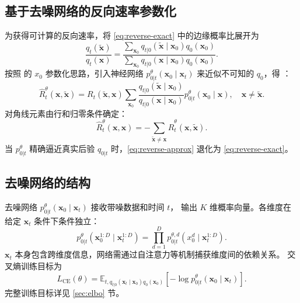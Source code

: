 \documentclass[12pt,a4paper]{ctexbook}
\theoremstyle{definition}
\begin{document}
\subsection{基于去噪网络的反向速率参数化}

为获得可计算的反向速率，将 \eqref{eq:reverse-exact} 中的边缘概率比展开为
\begin{equation}
\frac{q_t(\tilde{\boldsymbol{x}})}{q_t(\boldsymbol{x})} = \frac{\sum_{\boldsymbol{x}_0} q_{t|0}(\tilde{\boldsymbol{x}} \mid \boldsymbol{x}_0) q_0(\boldsymbol{x}_0)}{\sum_{\boldsymbol{x}_0} q_{t|0}(\boldsymbol{x} \mid \boldsymbol{x}_0) q_0(\boldsymbol{x}_0)}. \label{eq:ratio-expand}
\end{equation}
按照 \cite[§2]{austin2021d3pm} 的 $x_0$ 参数化思路，引入神经网络 $p_{0|t}^\theta(\boldsymbol{x}_0 \mid \boldsymbol{x}_t)$
来近似不可知的 $q_0$，得 \cite[§3.1]{campbell2022ctmc}：
\begin{equation}
\hat{R}_t^\theta(\boldsymbol{x}, \tilde{\boldsymbol{x}}) = R_t(\tilde{\boldsymbol{x}}, \boldsymbol{x}) \sum_{\boldsymbol{x}_0} \frac{q_{t|0}(\tilde{\boldsymbol{x}} \mid \boldsymbol{x}_0)}{q_{t|0}(\boldsymbol{x} \mid \boldsymbol{x}_0)} p_{0|t}^\theta(\boldsymbol{x}_0 \mid \boldsymbol{x}), \quad \boldsymbol{x} \neq \tilde{\boldsymbol{x}}. \label{eq:reverse-approx}
\end{equation}
对角线元素由行和归零条件确定：
\begin{equation}
\hat{R}_t^\theta(\boldsymbol{x}, \boldsymbol{x}) = -\sum_{\tilde{\boldsymbol{x}} \neq \boldsymbol{x}} \hat{R}_t^\theta(\boldsymbol{x}, \tilde{\boldsymbol{x}}). \label{eq:reverse-diag}
\end{equation}
当 $p_{0|t}^\theta$ 精确逼近真实后验 $q_{0|t}$ 时，\eqref{eq:reverse-approx} 退化为 \eqref{eq:reverse-exact}。

\subsection{去噪网络的结构}

去噪网络 $p_{0|t}^\theta(\boldsymbol{x}_0 \mid \boldsymbol{x}_t)$ 接收带噪数据和时间 $t$，
输出 $K$ 维概率向量。各维度在给定 $\boldsymbol{x}_t$ 条件下条件独立：
\begin{equation}
p_{0|t}^\theta(\boldsymbol{x}_0^{1:D} \mid \boldsymbol{x}_t^{1:D}) = \prod_{d=1}^D p_{0|t}^{\theta,d}(x_0^d \mid \boldsymbol{x}_t^{1:D}). \label{eq:net-factorization}
\end{equation}
$\boldsymbol{x}_t$ 本身包含跨维度信息，网络需通过自注意力等机制捕获维度间的依赖关系。
交叉熵训练目标为
\begin{equation}
L_{\text{CE}}(\theta) = \mathbb{E}_{t, q_{t|0}(\boldsymbol{x}_t \mid \boldsymbol{x}_0) q_0(\boldsymbol{x}_0)}\left[-\log p_{0|t}^\theta(\boldsymbol{x}_0 \mid \boldsymbol{x}_t)\right]. \label{eq:ce-loss}
\end{equation}
完整训练目标详见 \ref{sec:elbo} 节。
\end{document}
